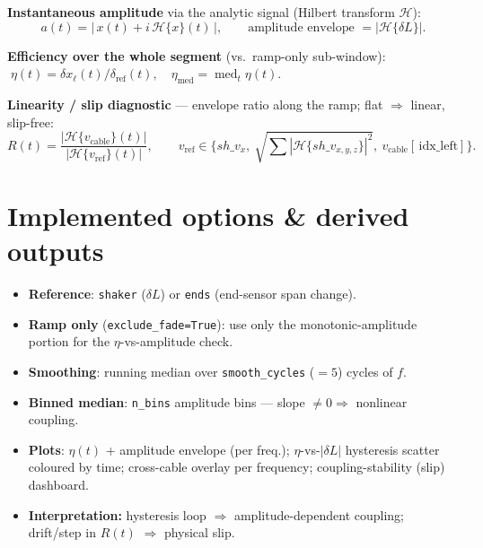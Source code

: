 \documentclass[11pt,a4paper]{article}
\begin{document}
\textbf{Instantaneous amplitude} via the analytic signal (Hilbert transform $\mathcal H$):
\begin{equation}
a(t)=\big|\,x(t)+i\,\mathcal H\{x\}(t)\,\big|,\qquad
\text{amplitude envelope }=|\mathcal H\{\delta L\}|.
\end{equation}

\textbf{Efficiency over the whole segment} (vs.\ ramp-only sub-window):
$\;\eta(t)=\delta x_\ell(t)/\delta_{\mathrm{ref}}(t),\quad \eta_{\mathrm{med}}=\operatorname{med}_t\eta(t).$

\textbf{Linearity / slip diagnostic} --- envelope ratio along the ramp; flat $\Rightarrow$ linear, slip-free:
\begin{equation}
R(t)=\frac{|\mathcal H\{v_{\mathrm{cable}}\}(t)|}{|\mathcal H\{v_{\mathrm{ref}}\}(t)|},\qquad
v_{\mathrm{ref}}\in\{sh\_v_x,\ \textstyle\sqrt{\sum|\mathcal H\{sh\_v_{x,y,z}\}|^2},\ v_{\mathrm{cable}}[\,\mathrm{idx\_left}]\}.
\end{equation}

\section*{Implemented options \& derived outputs}
\begin{itemize}
\item \textbf{Reference}: \texttt{shaker} ($\delta L$) or \texttt{ends} (end-sensor span change).
\item \textbf{Ramp only} (\texttt{exclude\_fade=True}): use only the monotonic-amplitude portion for the $\eta$-vs-amplitude check.
\item \textbf{Smoothing}: running median over \texttt{smooth\_cycles} ($=5$) cycles of $f$.
\item \textbf{Binned median}: \texttt{n\_bins} amplitude bins --- slope $\neq0\Rightarrow$ nonlinear coupling.
\item \textbf{Plots}: $\eta(t)$ + amplitude envelope (per freq.); $\eta$-vs-$|\delta L|$ hysteresis scatter coloured by time; cross-cable overlay per frequency; coupling-stability (slip) dashboard.
\item \textbf{Interpretation:} hysteresis loop $\Rightarrow$ amplitude-dependent coupling; drift/step in $R(t)$ $\Rightarrow$ physical slip.
\end{itemize}
\end{document}
